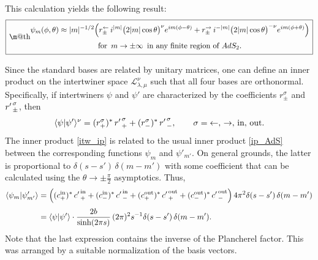 \documentclass[12pt]{article}
\makeatletter
\newcommand*{\wideboxed}[1]{\setlength{\fboxsep}{1ex}%
  \fbox{\m@th$\displaystyle#1$}}
\newcommand*{\braket}[2]{\langle{#1}|{#2}\rangle}
\newcommand{\calL}{\mathcal{L}}
\DeclareMathOperator{\AdS}{AdS}
\newcommand{\lar}{{\leftarrow}}
\newcommand{\rar}{{\rightarrow}}
\newcommand{\IN}{\text{in}}
\newcommand{\OUT}{\text{out}}
\def\widetilde#1{#1}%
\def\AdS{AdS}
\makeatother
\begin{document}
This calculation yields the following result:
\begin{equation}\label{minfty}
\wideboxed{
\begin{gathered}
\psi_m(\phi,\theta)\approx
|m|^{-1/2}\Bigl(
r^{\lar}_{\pm}\,i^{|m|}\bigl(2|m|\cos\theta\bigr)^{\nu}e^{im(\phi-\theta)}
+r^{\rar}_{\pm}\,i^{-|m|}\bigl(2|m|\cos\theta\bigr)^{-\nu}e^{im(\phi+\theta)}
\Bigr)\\[2pt]
\text{for }\, m\to\pm\infty\,
\text{ in any finite region of $\widetilde{\AdS}_2$}.
\end{gathered}
}
\end{equation}

Since the standard bases are related by unitary matrices, one can define an inner product on the intertwiner space $\calL^{\nu}_{\lambda,\mu}$ such that all four bases are orthonormal. Specifically, if intertwiners $\psi$ and $\psi'$ are characterized by the coefficients $r^{\sigma}_{\pm}$ and ${r'\kern1pt}^{\sigma}_{\pm}$, then
\begin{equation}\label{itw_ip}
\braket{\psi}{\psi'}^{\nu}
=(r^{\sigma}_{+})^{*}\,{r'\kern1pt}^{\sigma}_{+}
+(r^{\sigma}_{-})^{*}\,{r'\kern1pt}^{\sigma}_{-},\qquad
\sigma=\lar,\,\rar,\,\IN,\,\OUT.
\end{equation}
The inner product \eqref{itw_ip} is related to the usual inner product \eqref{ip_AdS} between the corresponding functions $\psi_{m}$ and $\psi'_{m'}$. On general grounds, the latter is proportional to $\delta(s-s')\,\delta(m-m')$ with some coefficient that can be calculated using the $\theta\to\pm\frac{\pi}{2}$ asymptotics. Thus,
\begin{align}
\nonumber
\braket{\psi_m}{\psi'_{m'}}&=
\Bigl((c_{+}^{\IN})^{*}\,{c'\kern1pt}_{+}^{\IN}
+(c_{-}^{\IN})^{*}\,{c'\kern1pt}_{-}^{\IN}
+(c_{+}^{\OUT})^{*}\,{c'\kern1pt}_{+}^{\OUT}
+(c_{-}^{\OUT})^{*}\,{c'\kern1pt}_{-}^{\OUT}\Bigr)\,
4\pi^2\delta(s-s')\,\delta(m-m')
\\[3pt]
\label{op_ip}
&=\braket{\psi}{\psi'}\cdot
\frac{2b}{\sinh(2\pi s)}\,(2\pi)^2
s^{-1}\delta(s-s')\,\delta(m-m').
\end{align}
Note that the last expression contains the inverse of the Plancherel factor. This was arranged by a suitable normalization of the basis vectors.
\end{document}
